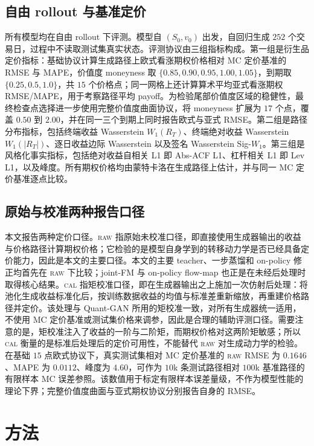 \documentclass[11pt]{ctexart}
\newcommand{\raw}{\textsc{raw}}
\renewcommand{\cal}{\textsc{cal}}
\begin{document}
\subsection{自由 rollout 与基准定价}
\label{sec:eval}
所有模型均在自由 rollout 下评测。模型自 $(S_0,v_0)$ 出发，自回归生成 $252$ 个交易日，过程中不读取测试集真实状态。评测协议由三组指标构成。第一组是衍生品定价指标：基础协议计算生成路径上欧式看涨期权价格相对 MC 定价基准的 RMSE 与 MAPE，价值度 moneyness 取 $\{0.85,0.90,0.95,1.00,1.05\}$，到期取 $\{0.25,0.5,1.0\}$，共 $15$ 个价格点；同一网格上还计算算术平均亚式看涨期权 RMSE/MAPE，用于考察路径平均 payoff。为检验尾部价值度区域的稳健性，最终检查点选择进一步使用完整价值度曲面协议，将 moneyness 扩展为 $17$ 个点，覆盖 $0.50$ 到 $2.00$，并在同一三个到期上同时报告欧式与亚式 RMSE。第二组是路径分布指标，包括终端收益 Wasserstein $W_1(R_T)$、终端绝对收益 Wasserstein $W_1(|R_T|)$、逐日收益边际 Wasserstein 以及签名 Wasserstein Sig-$W_1$。第三组是风格化事实指标，包括绝对收益自相关 L1 即 Abs-ACF L1、杠杆相关 L1 即 Lev L1，以及峰度。所有期权价格均由蒙特卡洛在生成路径上估计，并与同一 MC 定价基准逐点比较。

\subsection{原始与校准两种报告口径}
\label{sec:rawcal}
本文报告两种定价口径。\raw{} 指原始未校准口径，即直接使用生成器输出的收益与价格路径计算期权价格；它检验的是模型自身学到的转移动力学是否已经具备定价能力，因此是本文的主要口径。本文的主要 teacher、一步蒸馏和 on-policy 修正均首先在 \raw{} 下比较；joint-FM 与 on-policy flow-map 也正是在未经后处理时取得核心结果。\cal{} 指矩校准口径，即在生成器输出之上施加一次仿射后处理：将池化生成收益标准化后，按训练数据收益的均值与标准差重新缩放，再重建价格路径并定价。该处理与 Quant-GAN 所用的矩校准一致，对所有生成器统一适用，不使用 MC 定价基准或测试集价格来调参，因此是合理的辅助评测口径。需要注意的是，矩校准注入了收益的一阶与二阶矩，而期权价格对这两阶矩敏感；所以 \cal{} 衡量的是标准后处理后的定价可用性，不能替代 \raw{} 对生成动力学的检验。在基础 $15$ 点欧式协议下，真实测试集相对 MC 定价基准的 \raw{} RMSE 为 $0.1646$、MAPE 为 $0.0112$、峰度为 $4.60$，可作为 $10$k 条测试路径相对 $100$k 基准路径的有限样本 MC 误差参照。该数值用于标定有限样本误差量级，不作为模型性能的理论下界；完整价值度曲面与亚式期权协议分别报告自身的 RMSE。

\section{方法}
\label{sec:method}
\end{document}
